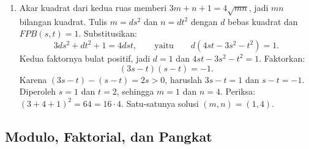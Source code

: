 \documentclass[12pt]{scrartcl}
\begin{document}
\begin{enumerate}[resume]
	\item Akar kuadrat dari kedua ruas memberi $3m + n + 1 = 4\sqrt{mn}$,
	jadi $mn$ bilangan kuadrat.
	Tulis $m = ds^2$ dan $n = dt^2$ dengan $d$ bebas kuadrat dan $FPB(s, t) = 1$.
	Substitusikan:
	\[ 3ds^2 + dt^2 + 1 = 4dst, \qquad \text{yaitu} \qquad d(4st - 3s^2 - t^2) = 1. \]
	Kedua faktornya bulat positif, jadi $d = 1$ dan $4st - 3s^2 - t^2 = 1$.
	Faktorkan:
	\[ (3s - t)(s - t) = -1. \]
	Karena $(3s - t) - (s - t) = 2s > 0$,
	haruslah $3s - t = 1$ dan $s - t = -1$.
	Diperoleh $s = 1$ dan $t = 2$, sehingga $m = 1$ dan $n = 4$.
	Periksa: $(3 + 4 + 1)^2 = 64 = 16 \cdot 4$.
	Satu-satunya solusi $(m, n) = (1, 4)$.
\end{enumerate}

\subsection{Modulo, Faktorial, dan Pangkat}
\end{document}
